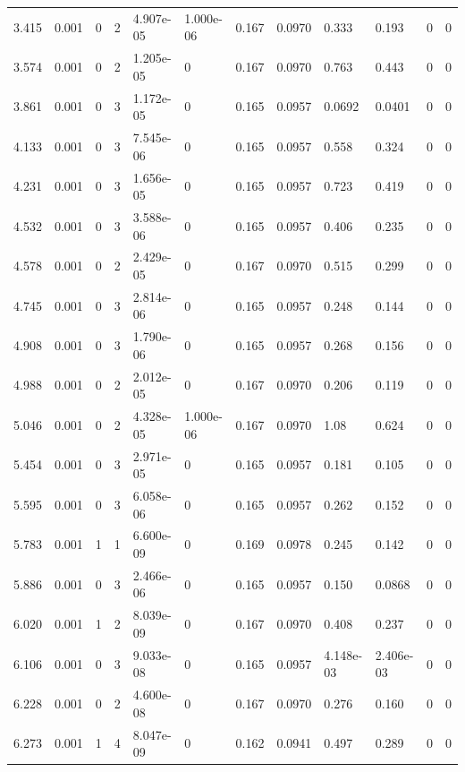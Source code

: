 \documentclass[preview]{standalone}
\begin{document}
{{\begin{tabular}{L{1.2cm}C{1.2cm} C{0.3cm}C{0.5cm} C{1.4cm}C{1.4cm} C{1.4cm}C{1.4cm} C{1.6cm}C{1.6cm} C{1.6cm}C{1.6cm}}
  3.415  &  0.001  & 0     &  2 &  4.907e-05  & 1.000e-06  &  0.167&   0.0970& 0.333 & 0.193   &  0 & 0  \\ 
  3.574  &  0.001  & 0     &  2 &  1.205e-05  & 0  &  0.167&   0.0970& 0.763 & 0.443   &  0 & 0  \\ 
  3.861  &  0.001  & 0     &  3 &  1.172e-05  & 0  &  0.165&   0.0957& 0.0692 & 0.0401   &  0 & 0  \\ 
  4.133  &  0.001  & 0     &  3 &  7.545e-06  & 0  &  0.165&   0.0957& 0.558 & 0.324   &  0 & 0  \\ 
  4.231  &  0.001  & 0     &  3 &  1.656e-05  & 0  &  0.165&   0.0957& 0.723 & 0.419   &  0 & 0  \\ 
  4.532  &  0.001  & 0     &  3 &  3.588e-06  & 0  &  0.165&   0.0957& 0.406 & 0.235   &  0 & 0  \\ 
  4.578  &  0.001  & 0     &  2 &  2.429e-05  & 0  &  0.167&   0.0970& 0.515 & 0.299   &  0 & 0  \\ 
  4.745  &  0.001  & 0     &  3 &  2.814e-06  & 0  &  0.165&   0.0957& 0.248 & 0.144   &  0 & 0  \\ 
  4.908  &  0.001  & 0     &  3 &  1.790e-06  & 0  &  0.165&   0.0957& 0.268 & 0.156   &  0 & 0  \\ 
  4.988  &  0.001  & 0     &  2 &  2.012e-05  & 0  &  0.167&   0.0970& 0.206 & 0.119   &  0 & 0  \\ 
  5.046  &  0.001  & 0     &  2 &  4.328e-05  & 1.000e-06  &  0.167&   0.0970& 1.08 & 0.624   &  0 & 0  \\ 
  5.454  &  0.001  & 0     &  3 &  2.971e-05  & 0  &  0.165&   0.0957& 0.181 & 0.105   &  0 & 0  \\ 
  5.595  &  0.001  & 0     &  3 &  6.058e-06  & 0  &  0.165&   0.0957& 0.262 & 0.152   &  0 & 0  \\ 
  5.783  &  0.001  & 1     &  1 &  6.600e-09  & 0  &  0.169&   0.0978& 0.245 & 0.142   &  0 & 0  \\ 
  5.886  &  0.001  & 0     &  3 &  2.466e-06  & 0  &  0.165&   0.0957& 0.150 & 0.0868   &  0 & 0  \\ 
  6.020  &  0.001  & 1     &  2 &  8.039e-09  & 0  &  0.167&   0.0970& 0.408 & 0.237   &  0 & 0  \\ 
  6.106  &  0.001  & 0     &  3 &  9.033e-08  & 0  &  0.165&   0.0957& 4.148e-03 & 2.406e-03   &  0 & 0  \\ 
  6.228  &  0.001  & 0     &  2 &  4.600e-08  & 0  &  0.167&   0.0970& 0.276 & 0.160   &  0 & 0  \\ 
  6.273  &  0.001  & 1     &  4 &  8.047e-09  & 0  &  0.162&   0.0941& 0.497 & 0.289   &  0 & 0  \\ 

\end{tabular}}}
\end{document}
